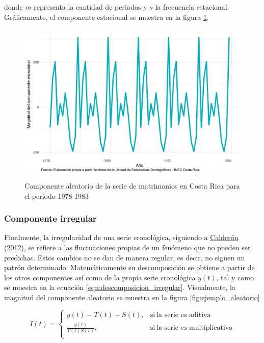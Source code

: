 \documentclass[
]{article}
\begin{document}
donde \(m\) representa la cantidad de periodos y \(s\) la frecuencia
estacional. Gráficamente, el componente estacional se muestra en la
figura \ref{fig:ejemplo_estacional}.

\begin{figure}[!h]
\includegraphics[width=1\linewidth,height=1\textheight]{Tesis_files/figure-latex/ejemplo_estacional-1} \caption{Componente aleatorio de la serie de matrimonios en Costa Rica para el periodo 1978-1983}\label{fig:ejemplo_estacional}
\end{figure}

\subsubsection{Componente irregular}

Finalmente, la irregularidad de una serie cronológica, siguiendo a
\protect\hyperlink{ref-calderon2012estadistica}{Calderón}
(\protect\hyperlink{ref-calderon2012estadistica}{2012}), se refiere a
las fluctuaciones propias de un fenómeno que no pueden ser predichas.
Estos cambios no se dan de manera regular, es decir, no siguen un patrón
determinado. Matemáticamente su descomposición se obtiene a partir de
los otros componentes así como de la propia serie cronológica \(y(t)\),
tal y como se muestra en la ecuación \ref{eqn:descomposicion_irregular}.
Visualmente, la magnitud del componente aleatorio se muestra en la
figura \ref{fig:ejemplo_aleatorio}

\begin{equation}
\label{eqn:descomposicion_irregular}
I(t)=
\begin{cases}
y(t)-T(t)-S(t), & \text{si}\ \text{la serie es aditiva} \\
\frac{y(t)}{T(t)S(t)} , & \text{si}\ \text{la serie es multiplicativa} \\
\end{cases}
\end{equation}
\end{document}
